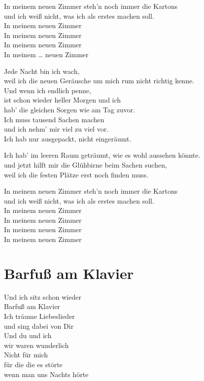 \documentclass[]{book}
\begin{document}
In meinem neuen Zimmer steh'n noch immer die Kartons\\
und ich weiß nicht, was ich als erstes machen soll.\\
In meinem neuen Zimmer\\
In meinem neuen Zimmer\\
In meinem neuen Zimmer\\
In meinem \ldots{} neuen Zimmer

Jede Nacht bin ich wach,\\
weil ich die neuen Geräusche um mich rum nicht richtig kenne.\\
Und wenn ich endlich penne,\\
ist schon wieder heller Morgen und ich\\
hab' die gleichen Sorgen wie am Tag zuvor.\\
Ich muss tausend Sachen machen\\
und ich nehm' mir viel zu viel vor.\\
Ich hab nur ausgepackt, nicht eingeräumt.

Ich hab' im leeren Raum geträumt, wie es wohl aussehen könnte.\\
und jetzt hilft mir die Glühbirne beim Sachen suchen,\\
weil ich die festen Plätze erst noch finden muss.

In meinem neuen Zimmer steh'n noch immer die Kartons\\
und ich weiß nicht, was ich als erstes machen soll.\\
In meinem neuen Zimmer\\
In meinem neuen Zimmer\\
In meinem neuen Zimmer\\
In meinem neuen Zimmer

\hypertarget{barfu-am-klavier}{%
\section{Barfuß am Klavier}\label{barfu-am-klavier}}

Und ich sitz schon wieder\\
Barfuß am Klavier\\
Ich träume Liebeslieder\\
und sing dabei von Dir\\
Und du und ich\\
wir waren wunderlich\\
Nicht für mich\\
für die die es störte\\
wenn man uns Nachts hörte
\end{document}
